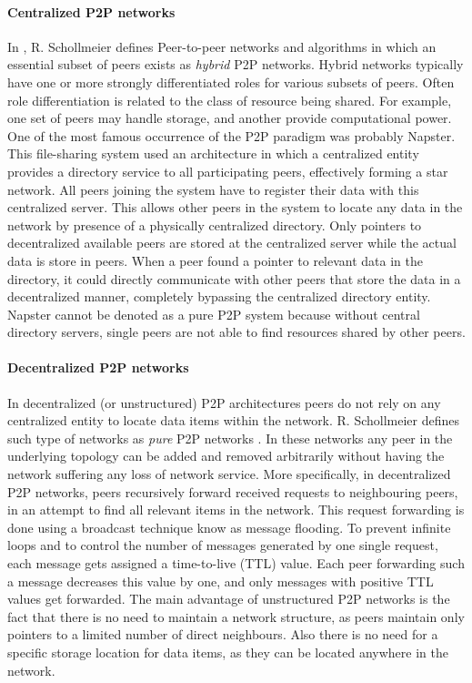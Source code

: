 \paragraph{Centralized P2P networks} 
In \cite{Schollmeier:2001:DPN:882470.883282}, R. Schollmeier defines Peer-to-peer networks and algorithms in which an essential subset of peers exists as \textit{hybrid} P2P networks. Hybrid networks typically have one or more strongly differentiated roles for various subsets of peers. Often role differentiation is related to the class of resource being shared. For example, one set of peers may handle storage, and another provide computational power. One of the most famous occurrence of the P2P paradigm was probably Napster\cite{Carlsson:2001:RFN:647728.734520}. This file-sharing system used an architecture in which a centralized entity provides a directory service to all participating peers, effectively forming a star network. All peers joining the system have to register their data with this centralized server. This allows other peers in the system to locate any data in the network by presence of a physically centralized directory. Only pointers to decentralized available peers are stored at the centralized server while the actual data is store in peers. When a peer found a pointer to relevant data in the directory, it could directly communicate with other peers that store the data in a decentralized manner, completely bypassing the centralized directory entity. Napster cannot be denoted as a pure P2P system because without central directory servers, single peers are not able to find resources shared by other peers.
\\

\paragraph{Decentralized P2P networks}
In decentralized (or unstructured) P2P architectures peers do not rely on any centralized entity to locate data items within the network. R. Schollmeier defines such type of networks as \textit{pure} P2P networks \cite{Schollmeier:2001:DPN:882470.883282}. In these networks any peer in the underlying topology can be added and removed arbitrarily without having the network suffering any loss of network service. More specifically, in decentralized P2P networks, peers recursively forward received requests to neighbouring peers, in an attempt to find all relevant items in the network. This request forwarding is done using a broadcast technique know as message flooding. To prevent infinite loops and to control the number of messages generated by one single request, each message gets assigned a time-to-live (TTL) value. Each peer forwarding such a message decreases this value by one, and only messages with positive TTL values get forwarded. The main advantage of unstructured P2P networks is the fact that there is no need to maintain a network structure, as peers maintain only pointers to a limited number of direct neighbours. Also there is no need for a specific storage location for data items, as they can be located anywhere in the network.
\\

